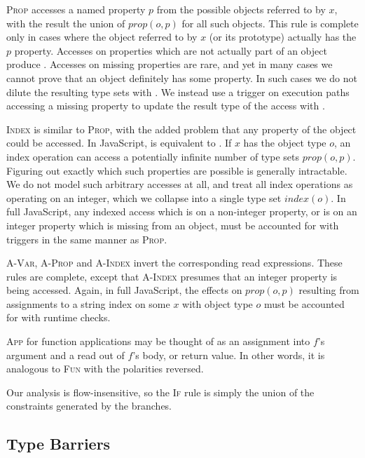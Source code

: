 \textsc{Prop} accesses a named property $p$ from the possible objects referred
to by $x$, with the result the union of $\mathit{prop}(o,p)$ for all such
objects.  This rule is complete only in cases where the object referred to by
$x$ (or its prototype) actually has the $p$ property. Accesses on properties
which are not actually part of an object produce .
Accesses on missing properties are rare,
and yet in many cases we cannot prove that an object
definitely has some property. In such cases we do not dilute the
resulting type sets with . We instead use a trigger
on execution paths accessing a missing property to update the result type
of the access with .

\textsc{Index} is similar to \textsc{Prop}, with the added problem that any
property of the object could be accessed.  In JavaScript,  is
equivalent to . If $x$ has the object type $o$, an index operation
can access a potentially infinite number of type sets $\mathit{prop}(o,p)$.
Figuring out exactly which such properties are possible is generally
intractable. We do not model such arbitrary accesses at all, and treat
all index operations as operating on an integer,
 which we collapse into a single type set
$\mathit{index}(o)$.  In full JavaScript, any indexed access which is on a
non-integer property, or is on an integer property which is missing from an
object, must be accounted for with triggers in the same manner as
\textsc{Prop}.

\textsc{A-Var}, \textsc{A-Prop} and \textsc{A-Index} invert the
corresponding read expressions.  These rules are complete, except that
\textsc{A-Index} presumes that an integer property is being accessed.
Again, in full JavaScript, the effects on $\mathit{prop}(o,p)$ resulting from
assignments to a string index  on some $x$ with object type $o$
must be accounted for with runtime checks.

\textsc{App} for function applications may be thought of as an assignment into
$f$'s argument and a read out of $f$'s body, or return value. In other words,
it is analogous to \textsc{Fun} with the polarities reversed.

Our analysis is flow-insensitive, so the \textsc{If} rule is simply the union
of the constraints generated by the branches.

\subsection{Type Barriers}
\label{sec:analysis-barriers}

